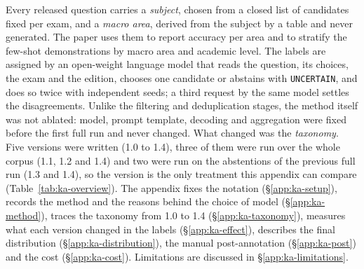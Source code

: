 Every released question carries a \emph{subject}, chosen from a closed list of
candidates fixed per exam, and a \emph{macro area}, derived from the subject
by a table and never generated. The paper uses them to report accuracy per
area and to stratify the few-shot demonstrations by macro area and academic
level. The labels are assigned by an open-weight language model that reads
the question, its choices, the exam and the edition, chooses one candidate or
abstains with \texttt{UNCERTAIN}, and does so twice with independent seeds; a
third request by the same model settles the disagreements. Unlike the
filtering and deduplication stages, the method itself was not ablated: model,
prompt template, decoding and aggregation were fixed before the first full run
and never changed. What changed was the \emph{taxonomy}. Five versions were
written (1.0 to 1.4), three of them were run over the whole corpus (1.1, 1.2
and 1.4) and two were run on the abstentions of the previous full run (1.3 and
1.4), so the version is the only treatment this appendix can compare
(Table~\ref{tab:ka-overview}). The appendix fixes the notation
(\S\ref{app:ka-setup}), records the method and the reasons behind the choice
of model (\S\ref{app:ka-method}), traces the taxonomy from 1.0 to 1.4
(\S\ref{app:ka-taxonomy}), measures what each version changed in the labels
(\S\ref{app:ka-effect}), describes the final distribution
(\S\ref{app:ka-distribution}), the manual post-annotation
(\S\ref{app:ka-post}) and the cost (\S\ref{app:ka-cost}). Limitations are
discussed in \S\ref{app:ka-limitations}.

